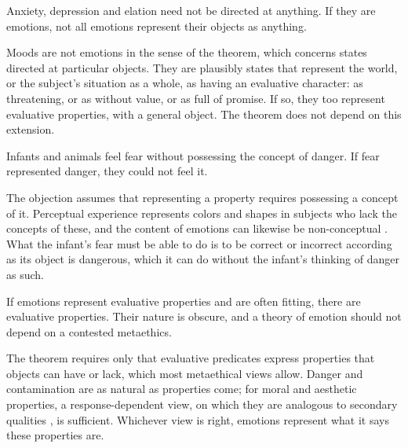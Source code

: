 \documentclass{situationist-preprint}
\begin{document}
\begin{objection}
Anxiety, depression and elation need not be directed at anything. If they are emotions, not all emotions represent their objects as anything.
\end{objection}

\begin{reply}
Moods are not emotions in the sense of the theorem, which concerns states directed at particular objects. They are plausibly states that represent the world, or the subject's situation as a whole, as having an evaluative character: as threatening, or as without value, or as full of promise. If so, they too represent evaluative properties, with a general object. The theorem does not depend on this extension.
\end{reply}

\begin{objection}
Infants and animals feel fear without possessing the concept of danger. If fear represented danger, they could not feel it.
\end{objection}

\begin{reply}
The objection assumes that representing a property requires possessing a concept of it. Perceptual experience represents colors and shapes in subjects who lack the concepts of these, and the content of emotions can likewise be non-conceptual \citep{Tappolet2016}. What the infant's fear must be able to do is to be correct or incorrect according as its object is dangerous, which it can do without the infant's thinking of danger as such.
\end{reply}

\begin{objection}
If emotions represent evaluative properties and are often fitting, there are evaluative properties. Their nature is obscure, and a theory of emotion should not depend on a contested metaethics.
\end{objection}

\begin{reply}
The theorem requires only that evaluative predicates express properties that objects can have or lack, which most metaethical views allow. Danger and contamination are as natural as properties come; for moral and aesthetic properties, a response-dependent view, on which they are analogous to secondary qualities \citep{McDowell1985}, is sufficient. Whichever view is right, emotions represent what it says these properties are.
\end{reply}
\end{document}
